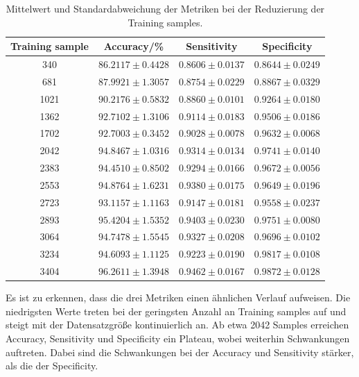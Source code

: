 \begin{table}[H]
    \centering
    {\small
        \begin{tabular}{cccc}
            \toprule
            Training sample & Accuracy/\% & Sensitivity & Specificity\\
            \midrule
            340  & $86.2117 \pm 0.4428$ & $0.8606 \pm 0.0137 $ & $0.8644 \pm 0.0249$\\
            681  & $87.9921 \pm 1.3057$ & $0.8754 \pm 0.0229 $ & $0.8867 \pm 0.0329$\\
            1021 & $90.2176 \pm 0.5832$ & $0.8860 \pm 0.0101 $ & $0.9264 \pm 0.0180$\\
            1362 & $92.7102 \pm 1.3106$ & $0.9114 \pm 0.0183 $ & $0.9506 \pm 0.0186$\\
            1702 & $92.7003 \pm 0.3452$ & $0.9028 \pm 0.0078 $ & $0.9632 \pm 0.0068$\\
            2042 & $94.8467 \pm 1.0316$ & $0.9314 \pm 0.0134 $ & $0.9741 \pm 0.0140$\\
            2383 & $94.4510 \pm 0.8502$ & $0.9294 \pm 0.0166 $ & $0.9672 \pm 0.0056$\\
            2553 & $94.8764 \pm 1.6231$ & $0.9380 \pm 0.0175 $ & $0.9649 \pm 0.0196$\\
            2723 & $93.1157 \pm 1.1163$ & $0.9147 \pm 0.0181 $ & $0.9558 \pm 0.0237$\\
            2893 & $95.4204 \pm 1.5352$ & $0.9403 \pm 0.0230 $ & $0.9751 \pm 0.0080$\\
            3064 & $94.7478 \pm 1.5545$ & $0.9327 \pm 0.0208 $ & $0.9696 \pm 0.0102$\\
            3234 & $94.6093 \pm 1.1125$ & $0.9223 \pm 0.0190 $ & $0.9817 \pm 0.0108$\\
            3404 & $96.2611 \pm 1.3948$ & $0.9462 \pm 0.0167 $ & $0.9872 \pm 0.0128$\\ 
            \bottomrule
        \end{tabular}
    }
  \caption{Mittelwert und Standardabweichung der Metriken bei der Reduzierung der Training samples.}
  \label{tab:reduzierung_trainingsdaten}
\end{table}
Es ist zu erkennen, dass die drei Metriken einen ähnlichen Verlauf aufweisen.
Die niedrigsten Werte treten bei der geringsten Anzahl an Training samples auf und steigt mit der Datensatzgröße kontinuierlich an.
Ab etwa 2042 Samples erreichen Accuracy, Sensitivity und Specificity ein Plateau, wobei weiterhin Schwankungen auftreten.
Dabei sind die Schwankungen bei der Accuracy und Sensitivity stärker, als die der Specificity. 
